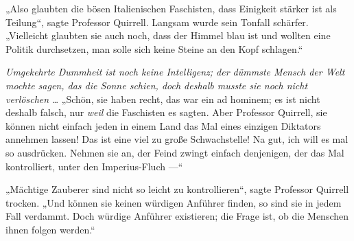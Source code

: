 „Also glaubten die bösen Italienischen Faschisten, dass Einigkeit stärker ist als Teilung“, sagte Professor Quirrell. Langsam wurde sein Tonfall schärfer.
„Vielleicht glaubten sie auch noch, dass der Himmel blau ist und wollten eine Politik durchsetzen, man solle sich keine Steine an den Kopf schlagen.“

\emph{Umgekehrte Dummheit ist noch keine Intelligenz; der dümmste Mensch der Welt mochte sagen, das die Sonne schien, doch deshalb musste sie noch nicht verlöschen} … %
„Schön, sie haben recht, das war ein ad hominem; es ist nicht deshalb falsch, nur \emph{weil} die Faschisten es sagten. Aber Professor Quirrell, sie können nicht einfach jeden in einem Land das Mal eines einzigen Diktators annehmen lassen! Das ist eine viel zu große Schwachstelle!%
Na gut, ich will es mal so ausdrücken. Nehmen sie an, der Feind zwingt einfach denjenigen, der das Mal kontrolliert, unter den Imperius-Fluch —“

„Mächtige Zauberer sind nicht so leicht zu kontrollieren“, sagte Professor Quirrell trocken.
„Und können sie keinen würdigen Anführer finden, so sind sie in jedem Fall verdammt. Doch würdige Anführer existieren; die Frage ist, ob die Menschen ihnen folgen werden.“

